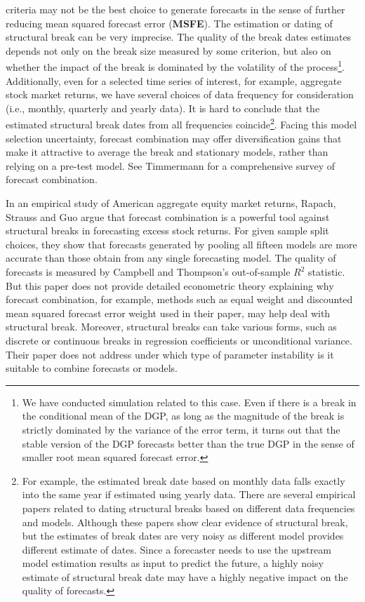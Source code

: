 criteria may not be the best choice to generate forecasts in the sense of further reducing mean squared forecast error (\textbf{MSFE}). The estimation or dating of structural break can be very imprecise. The quality of the break dates estimates depends not only on the break size measured by some criterion, but also on whether the impact of the break is dominated by the volatility of the process\footnote{We have conducted simulation related to this case. Even if there is a break in the conditional mean of the DGP, as long as the magnitude of the break is strictly dominated by the variance of the error term, it turns out that the stable version of the DGP forecasts better than the true DGP in the sense of smaller root mean squared forecast error.}. Additionally, even for a selected time series of interest, for example, aggregate stock market returns, we have several choices of data frequency for consideration (i.e., monthly, quarterly and yearly data). It is hard to conclude that the estimated structural break dates from all frequencies coincide\footnote{For example, the estimated break date based on monthly data falls exactly into the same year if estimated using yearly data. There are several empirical papers related to dating structural breaks based on different data frequencies and models. Although these papers show clear evidence of structural break, but the estimates of break dates are very noisy as different model provides different estimate of dates. Since a forecaster needs to use the upstream model estimation results as input to predict the future, a highly noisy estimate of structural break date may have a highly negative impact on the quality of forecasts.}. Facing this model selection uncertainty, forecast combination may offer diversification gains that make it attractive to average the break and stationary models, rather than relying on a pre-test model. See Timmermann \cite{timmermann2006forecast} for a comprehensive survey of forecast combination.

In an empirical study of American aggregate equity market returns, Rapach, Strauss and Guo \cite{rsz2010} argue that forecast combination is a powerful tool against structural breaks in forecasting excess stock returns. For given sample split choices, they show that forecasts generated by pooling all fifteen models are more accurate than those obtain from any single forecasting model. The quality of forecasts is measured by Campbell and Thompson's \cite{campbell_thompson_RFS2008} out-of-sample $R^{2}$ statistic. But this paper does not provide detailed econometric theory explaining why forecast combination, for example, methods such as equal weight and discounted mean squared forecast error weight used in their paper, may help deal with structural break. Moreover, structural breaks can take various forms, such as discrete or continuous breaks in regression coefficients or unconditional variance. Their paper does not address under which type of parameter instability is it suitable to combine forecasts or models.

